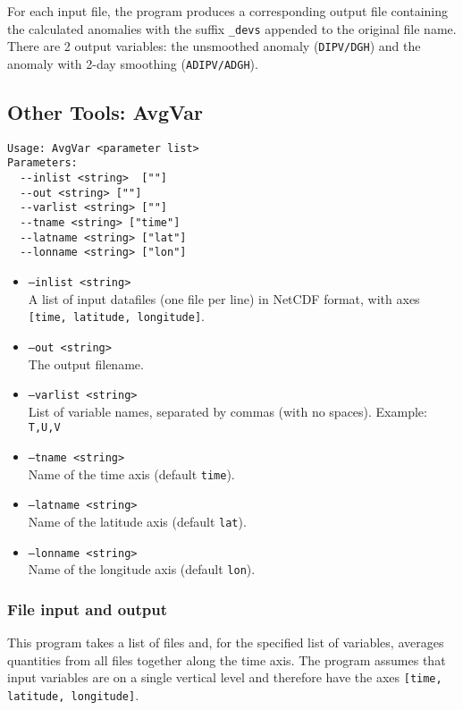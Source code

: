 \documentclass{article}
\begin{document}
For each input file, the program produces a corresponding output file containing the calculated anomalies with the suffix \texttt{\_devs} appended to the original file name. There are 2 output variables: the unsmoothed anomaly (\texttt{DIPV/DGH}) and  the anomaly with 2-day smoothing (\texttt{ADIPV/ADGH}).


\subsection{Other Tools: AvgVar}
\begin{verbatim}
Usage: AvgVar <parameter list>
Parameters:
  --inlist <string>  [""]
  --out <string> [""]
  --varlist <string> [""]
  --tname <string> ["time"]
  --latname <string> ["lat"]
  --lonname <string> ["lon"]
\end{verbatim}

\begin{itemize}
\item[]\texttt{--inlist <string>} \\ A list of input datafiles (one file per line) in NetCDF format, with axes \texttt{[time, latitude, longitude]}. 
\item[] \texttt{--out <string>}\\ The output filename.
\item[] \texttt{--varlist <string>}\\ List of variable names, separated by commas (with no spaces). Example: \texttt{T,U,V}
\item[] \texttt{--tname <string>}\\Name of the time axis (default \texttt{time}).
\item[]\texttt{--latname <string>}\\Name of the latitude axis (default \texttt{lat}).
\item[]\texttt{--lonname <string>}\\Name of the longitude axis (default \texttt{lon}).
\end{itemize}

\subsubsection{File input and output}
This program takes a list of files and, for the specified list of variables, averages quantities from all files together along the time axis. The program assumes that input variables are on a single vertical level and therefore have the axes \texttt{[time, latitude, longitude]}. 
\end{document}
